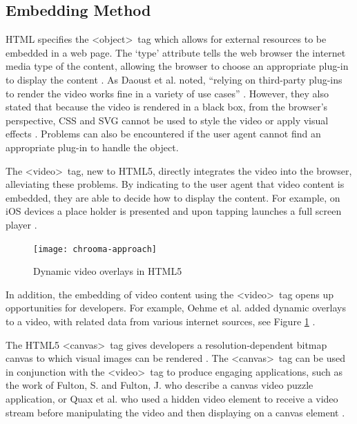 \documentclass[journal]{IEEEtran}
\begin{document}
\subsection{Embedding Method} 
HTML specifies the \textless object\textgreater~tag which allows for external resources to be embedded in a web page. The `type' attribute tells the web browser the internet media type of the content, allowing the browser to choose an appropriate plug-in to display the content \cite{standard:html5}. As Daoust et al. noted, ``relying on third-party plug-ins to render the video works fine in a variety of use cases'' \cite{article:towardsVideoOnTheWebWithHTML5}. However, they also stated that because the video is rendered in a black box, from the browser's perspective, CSS and SVG cannot be used to style the video or apply visual effects \cite{article:towardsVideoOnTheWebWithHTML5}. Problems can also be encountered if the user agent cannot find an appropriate plug-in to handle the object.

The \textless video\textgreater~tag, new to HTML5, directly integrates the video into the browser, alleviating these problems. By indicating to the user agent that video content is embedded, they are able to decide how to display the content. For example, on iOS devices a place holder is presented and upon tapping launches a full screen player \cite{website:safariHTML5}.

\begin{figure}[!t]
\centering
\texttt{[image: chrooma-approach]}
\caption{Dynamic video overlays in HTML5 \cite{inproceedings:theChroomaApproach}}
\label{fig:chroomaApproach}
\end{figure} 

In addition, the embedding of video content using the \textless video\textgreater~tag opens up opportunities for developers. For example, Oehme et al. added dynamic overlays to a video, with related data from various internet sources, see Figure \ref{fig:chroomaApproach} \cite{inproceedings:theChroomaApproach}.

The HTML5 \textless canvas\textgreater~tag gives developers a resolution-dependent bitmap canvas to which visual images can be rendered \cite{standard:html5}. The \textless canvas\textgreater~tag can be used in conjunction with the \textless video\textgreater~tag to produce engaging applications, such as the work of Fulton, S. and Fulton, J. who describe a canvas video puzzle application, or Quax et al. who used a hidden video element to receive a video stream before manipulating the video and then displaying on a canvas element \cite{book:html5canvas}\cite{inproceedings:aPracticalAndScableMethodForStreaming}.
\end{document}
